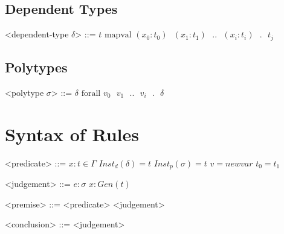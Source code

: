 \documentclass[letterpaper]{article}
\begin{document}
  \subsection*{Dependent Types}
  \begin{grammar}
    \renewcommand{\syntleft}{}
    \renewcommand{\syntright}{}
    <dependent-type $\delta$> ::= $t$
    \alt $\textrm{mapval }(x_0: t_0)\textrm{ }(x_1: t_1)\textrm{ }..\textrm{ }(x_i: t_i)\textrm{ }.\textrm{ }t_j$
  \end{grammar}

  \subsection*{Polytypes}
  \begin{grammar}
    \renewcommand{\syntleft}{}
    \renewcommand{\syntright}{}
    <polytype $\sigma$> ::= $\delta$
    \alt $\textrm{forall }v_0\textrm{ }v_1\textrm{ }..\textrm{ }v_i\textrm{ }.\textrm{ }\delta$
  \end{grammar}

  \newpage


  \section*{Syntax of Rules}

  \begin{grammar}
    \renewcommand{\syntleft}{}
    \renewcommand{\syntright}{}
    <predicate> ::= $x: t\in\Gamma$
      \alt $Inst_d(\delta)=t$
      \alt $Inst_p(\sigma)=t$
      \alt $v=newvar$
      \alt $t_0=t_1$
  \end{grammar}

  \begin{grammar}
    \renewcommand{\syntleft}{}
    \renewcommand{\syntright}{}
    <judgement> ::= $e: \sigma$
      \alt $x: Gen(t)$
  \end{grammar}

  \begin{grammar}
    \renewcommand{\syntleft}{}
    \renewcommand{\syntright}{}
    <premise> ::= <predicate>
      \alt <judgement>
  \end{grammar}

  \begin{grammar}
    \renewcommand{\syntleft}{}
    \renewcommand{\syntright}{}
    <conclusion> ::= <judgement>
  \end{grammar}
\end{document}
